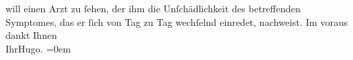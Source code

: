 \begin{ledgroupsized}[t]{13cm}
                    will einen Arzt zu ſehen, der ihm die Unſchädlichkeit {\pb}des betreffenden Symptomes,
                    das er ſich von Tag zu Tag wechſelnd einredet, nachweist.\pend
           \pstart
           Im voraus dankt Ihnen{\\[\baselineskip]} Ihr\spacefill\mbox{Hugo.}\pend
           \leftskip=0em{}\endnumbering{}\end{ledgroupsized}  \newcommand{\dateiname}{L00708}\newcommand{\titel}{Hugo von Hofmannsthal an Arthur Schnitzler, [20. 7. 1897]}\newcommand{\editorInnen}{Martin Anton Müller und Gerd-Hermann Susen}
      